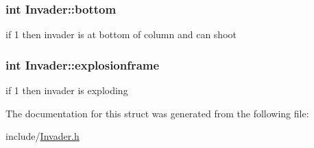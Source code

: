 \subsubsection[{bottom}]{\setlength{\rightskip}{0pt plus 5cm}int Invader\+::bottom}\label{structInvader_ae58a7596b4a32ba1f3a23941b1fc6995}
if 1 then invader is at bottom of column and can shoot \hypertarget{structInvader_aa09d48ba0bdf587a6532711c226594c7}{}
\subsubsection[{explosionframe}]{\setlength{\rightskip}{0pt plus 5cm}int Invader\+::explosionframe}\label{structInvader_aa09d48ba0bdf587a6532711c226594c7}
if 1 then invader is exploding 

The documentation for this struct was generated from the following file\+:\begin{DoxyCompactItemize}
\item 
include/\hyperlink{Invader_8h}{Invader.\+h}\end{DoxyCompactItemize}
